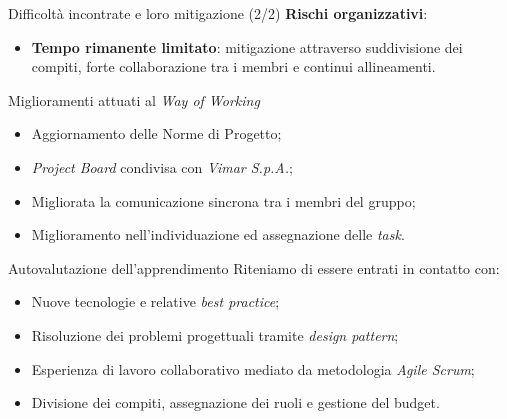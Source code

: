 \documentclass{beamer}
\begin{document}
\begin{frame}{Difficoltà incontrate e loro mitigazione (2/2)}
  \textbf{Rischi organizzativi}:
  \vspace{0.15cm}
  \begin{itemize}
    \item \textbf{Tempo rimanente limitato}: mitigazione attraverso suddivisione dei compiti, forte collaborazione tra i membri e continui allineamenti.
  \end{itemize}
\end{frame}

\begin{frame}{Miglioramenti attuati al \textit{Way of Working}}
  \begin{itemize}
    \item Aggiornamento delle Norme di Progetto;
          \vspace{0.55cm}
    \item \textit{Project Board} condivisa con \textit{Vimar S.p.A.};
          \vspace{0.55cm}
    \item Migliorata la comunicazione sincrona tra i membri del gruppo;
          \vspace{0.55cm}
    \item Miglioramento nell'individuazione ed assegnazione delle \textit{task}.
  \end{itemize}
\end{frame}

\begin{frame}{Autovalutazione dell'apprendimento}
  Riteniamo di essere entrati in contatto con:
  \vspace{0.3cm}
  \begin{itemize}
    \item Nuove tecnologie e relative \textit{best practice};
          \vspace{0.3cm}
    \item Risoluzione dei problemi progettuali tramite \textit{design pattern};
          \vspace{0.3cm}
    \item Esperienza di lavoro collaborativo mediato da metodologia \textit{Agile Scrum};
          \vspace{0.3cm}
    \item Divisione dei compiti, assegnazione dei ruoli e gestione del budget.
  \end{itemize}
\end{frame}
\end{document}
